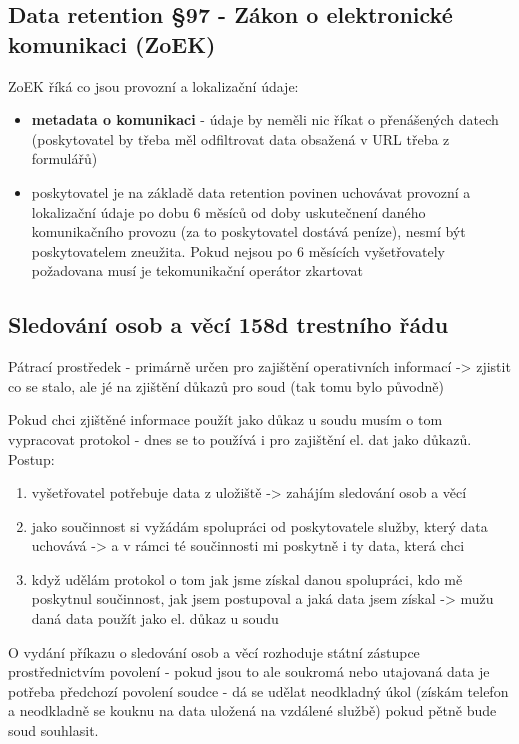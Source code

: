 \subsection{Data retention §97 - Zákon o elektronické komunikaci (ZoEK)}
ZoEK říká co jsou provozní a lokalizační údaje:
\begin{itemize}
    \item \textbf{metadata o komunikaci} - údaje by neměli nic říkat o přenášených datech (poskytovatel by třeba měl odfiltrovat data obsažená v URL třeba z formulářů)
    \item  poskytovatel je na základě data retention povinen uchovávat provozní a lokalizační údaje po dobu 6 měsíců od doby uskutečnení daného komunikačního provozu (za to poskytovatel dostává peníze), nesmí být poskytovatelem zneužita. Pokud nejsou po 6 měsících vyšetřovately požadovana musí je tekomunikační operátor zkartovat
\end{itemize}

\subsection{Sledování osob a věcí 158d trestního řádu}
Pátrací prostředek - primárně určen pro zajištění operativních informací -> zjistit co se
stalo, ale jé na zjištění důkazů pro soud (tak tomu bylo původně)

Pokud chci zjištěné informace použít jako důkaz u soudu musím o tom vypracovat protokol - dnes se to používá i pro
zajištění el. dat jako důkazů. Postup:
\begin{enumerate}
    \item vyšetřovatel potřebuje data z uložiště -> zahájím sledování osob a věcí
    \item jako součinnost si vyžádám spolupráci od poskytovatele služby, který data uchovává -> a v rámci té součinnosti mi poskytně i ty data, která chci
    \item když udělám protokol o tom jak jsme získal danou spolupráci, kdo mě poskytnul součinnost, jak jsem postupoval a jaká data jsem získal -> mužu daná data použít jako el. důkaz u soudu
\end{enumerate}
O vydání příkazu o sledování osob a věcí rozhoduje státní zástupce prostřednictvím povolení - pokud jsou to ale soukromá nebo utajovaná data je potřeba předchozí povolení soudce - dá se udělat neodkladný úkol (získám telefon a neodkladně se kouknu na data uložená na vzdálené službě) pokud pětně bude soud souhlasit.

